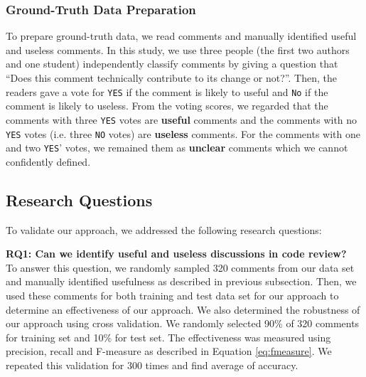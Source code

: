 


%

\subsubsection{Ground-Truth Data Preparation}
To prepare ground-truth data, we read comments and manually identified useful and useless comments. In this study, we use three people (the first two authors and one student) independently classify comments by giving a question that ``Does this comment technically contribute to its change or not?''. Then, the readers gave a vote for \texttt{YES} if the comment is likely to useful and \texttt{No} if the comment is likely to useless. From the voting scores, we regarded that the comments with three \texttt{YES} votes are \textbf{useful} comments and the comments with no \texttt{YES} votes (i.e. three \texttt{NO} votes) are \textbf{useless} comments. For the comments with one and two \texttt{YES}' votes, we remained them as \textbf{unclear} comments which we cannot confidently defined. 

\subsection{Research Questions}
To validate our approach, we addressed the following research questions:

\noindent \textbf{RQ1: Can we identify useful and useless discussions in code review?}\\
\indent To answer this question, we randomly sampled 320 comments from our data set and manually identified usefulness as described in previous subsection. Then, we used these comments for both training and test data set for our approach to determine an effectiveness of our approach. We also determined the robustness of our approach using cross validation. We randomly selected 90\% of 320 comments for training set and 10\% for test set.
The effectiveness was measured using precision, recall and F-measure as described in Equation \ref{eq:fmeasure}. We repeated this validation for 300 times and find average of accuracy.

